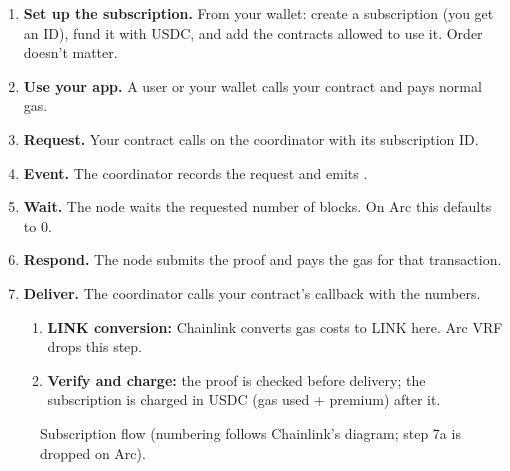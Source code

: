 \documentclass[11pt,a4paper]{article}
\begin{document}
\begin{enumerate}[label=\textbf{\arabic*.}]
  \item \textbf{Set up the subscription.} From your wallet: create a subscription (you get an ID), fund it with USDC, and add the contracts allowed to use it. Order doesn't matter.
  \item \textbf{Use your app.} A user or your wallet calls your contract and pays normal gas.
  \item \textbf{Request.} Your contract calls  on the coordinator with its subscription ID.
  \item \textbf{Event.} The coordinator records the request and emits .
  \item \textbf{Wait.} The node waits the requested number of blocks. On Arc this defaults to 0.
  \item \textbf{Respond.} The node submits the proof and pays the gas for that transaction.
  \item \textbf{Deliver.} The coordinator calls your contract's callback with the numbers.
  \begin{enumerate}[label=\textbf{7\alph*.}]
    \item \textbf{LINK conversion:} Chainlink converts gas costs to LINK here. Arc VRF drops this step.
    \item \textbf{Verify and charge:} the proof is checked before delivery; the subscription is charged in USDC (gas used + premium) after it.
  \end{enumerate}
\end{enumerate}

\begin{figure}[ht]
\centering
{}
\caption{Subscription flow (numbering follows Chainlink's diagram; step 7a is dropped on Arc).}
\end{figure}
\end{document}

